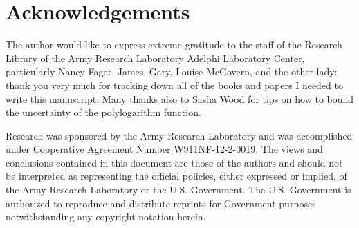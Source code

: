 \documentclass[letterpaper,12pt]{article}
\begin{document}
\section{Acknowledgements}
The author would like to express extreme gratitude to the staff of the Research Library of the Army Research Laboratory Adelphi Laboratory Center, particularly Nancy Faget, James, Gary, Louise McGovern, and the other lady: thank you very much for tracking down all of the books and papers I needed to write this manuscript. Many thanks also to Sasha Wood for tips on how to bound the uncertainty of the polylogarithm function.

Research was sponsored by the Army Research Laboratory and was accomplished under Cooperative Agreement Number W911NF-12-2-0019. The views and conclusions contained in this document are those of the authors and should not be interpreted as representing the official policies, either expressed or implied, of the Army Research Laboratory or the U.S. Government. The U.S. Government is authorized to reproduce and distribute reprints for Government purposes notwithstanding any copyright notation herein.




\end{document}
